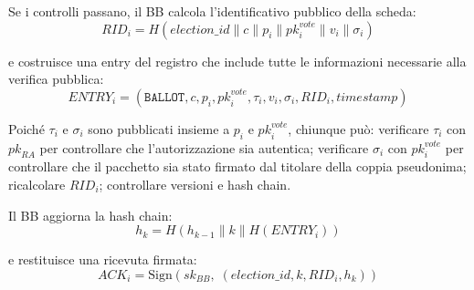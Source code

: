 \documentclass[12pt,a4paper]{article}
\newcommand{\pk}{\mathit{pk}}
\newcommand{\sk}{\mathit{sk}}
\begin{document}
Se i controlli passano, il BB calcola l'identificativo pubblico della scheda:
\[
\mathit{RID}_i = H(\mathit{election\_id} \| c \| p_i \| \pk_i^{\mathit{vote}} \| v_i \| \sigma_i)
\]

e costruisce una entry del registro che include tutte le informazioni necessarie alla verifica pubblica:
\[
\mathit{ENTRY}_i = (\texttt{BALLOT}, c, p_i, \pk_i^{\mathit{vote}}, \tau_i, v_i, \sigma_i, \mathit{RID}_i, \mathit{timestamp})
\]

Poich\'e $\tau_i$ e $\sigma_i$ sono pubblicati insieme a $p_i$ e $\pk_i^{\mathit{vote}}$, chiunque pu\`o: verificare $\tau_i$ con $\pk_{\mathit{RA}}$ per controllare che l'autorizzazione sia autentica; verificare $\sigma_i$ con $\pk_i^{\mathit{vote}}$ per controllare che il pacchetto sia stato firmato dal titolare della coppia pseudonima; ricalcolare $\mathit{RID}_i$; controllare versioni e hash chain.

Il BB aggiorna la hash chain:
\[
h_k = H(h_{k-1} \| k \| H(\mathit{ENTRY}_i))
\]

e restituisce una ricevuta firmata:
\[
\mathit{ACK}_i = \mathrm{Sign}(\sk_{\mathit{BB}},\; (\mathit{election\_id}, k, \mathit{RID}_i, h_k))
\]
\end{document}
